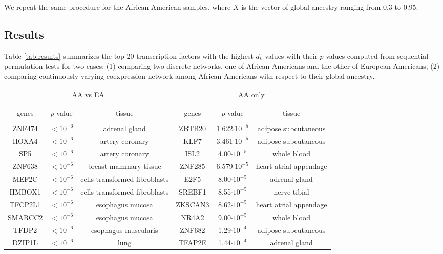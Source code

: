 \documentclass[aoas,preprint]{imsart}
\numberwithin{equation}{section}
\theoremstyle{plain}
\begin{document}
 We repeat the same procedure for the African American samples, where $X$ is the vector of global ancestry ranging from 0.3 to 0.95. 

\subsection{Results}
Table \ref{tab:results} summarizes the top 20 transcription factors with the highest $d_k$ values with their $p$-values computed from sequential permutation tests for two cases: (1) comparing two discrete networks, one of African Americans and the other of European Americans, (2) comparing continuously varying coexpression network among African Americans with respect to their global ancestry.
\begin{table}[!htbp] \centering 
\begin{tabular}{@{\extracolsep{5pt}} ccc | ccc} 
    \multicolumn{3}{c||}{AA vs EA} & \multicolumn{3}{c}{AA only}\\
\\[-1.8ex]\hline 
\hline \\[-1.8ex]
genes & $p$-value & tissue & genes & $p$-value & tissue \\ 
\hline \\[-1.8ex] 
ZNF474 & $<10^{-6}$ & adrenal gland & ZBTB20 & 1.622$\cdot 10^{-5}$ & adipose subcutaneous \\ 
HOXA4 & $<10^{-6}$ & artery coronary & KLF7 & 3.461$\cdot 10^{-5}$ & adipose subcutaneous \\ 
SP5 & $<10^{-6}$ & artery coronary& ISL2 & 4.00$\cdot 10^{-5}$ & whole blood \\ 
ZNF638 & $<10^{-6}$ & breast mammary tissue & ZNF285 & 6.579$\cdot 10^{-5}$ & heart atrial appendage  \\ 
MEF2C & $<10^{-6}$ & cells transformed fibroblasts & E2F5 & 8.00$\cdot 10^{-5}$ & adrenal gland \\ 
HMBOX1 & $<10^{-6}$ & cells transformed fibroblasts & SREBF1 & 8.55$\cdot 10^{-5}$ & nerve tibial \\  
TFCP2L1 & $<10^{-6}$ & esophagus mucosa & ZKSCAN3 & 8.62$\cdot 10^{-5}$ & heart atrial appendage \\ 
SMARCC2 & $<10^{-6}$ & esophagus mucosa & NR4A2 & 9.00$\cdot 10^{-5}$ & whole blood \\ 
TFDP2 & $<10^{-6}$ & esophagus muscularis & ZNF682 & 1.29$\cdot 10^{-4}$ & adipose subcutaneous \\ 
DZIP1L & $<10^{-6}$ & lung & TFAP2E & 1.44$\cdot 10^{-4}$ & adrenal gland \\ 

\end{tabular}
\end{table}
\end{document}
